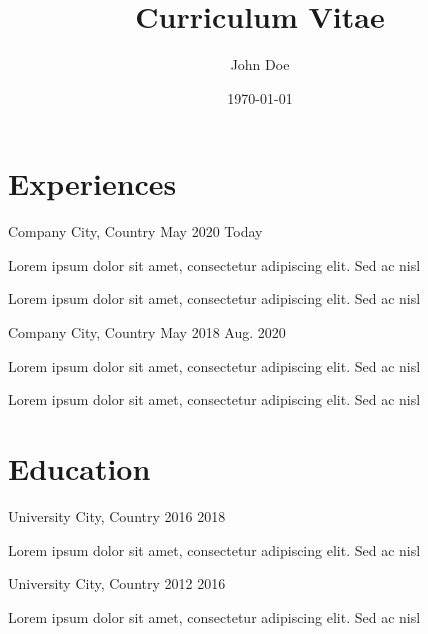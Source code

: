 \documentclass[english]{currivitae-elegant}
\title{Curriculum Vitae}
\author{John Doe}
\date{\today}
\begin{document}

\section[\faBriefcase]{Experiences}
           {Company}
           {City, Country}
           {May 2020}
           {Today}
           {
            \begin{compactitem}[]
                \item Lorem ipsum dolor sit amet, consectetur adipiscing elit. Sed ac nisl
                \item Lorem ipsum dolor sit amet, consectetur adipiscing elit. Sed ac nisl
            \end{compactitem}
           }

           {Company}
           {City, Country}
           {May 2018}
           {Aug. 2020}
           {
            \begin{compactitem}[]
                \item Lorem ipsum dolor sit amet, consectetur adipiscing elit. Sed ac nisl
                \item Lorem ipsum dolor sit amet, consectetur adipiscing elit. Sed ac nisl
            \end{compactitem}
           }

\section[\faGraduationCap]{Education}
           {University}
           {City, Country}
           {2016}
           {2018}
           {
            \begin{compactitem}[]
                \item Lorem ipsum dolor sit amet, consectetur adipiscing elit. Sed ac nisl
            \end{compactitem}
           }

           {University}
           {City, Country}
           {2012}
           {2016}
           {
            \begin{compactitem}[]
                \item Lorem ipsum dolor sit amet, consectetur adipiscing elit. Sed ac nisl
            \end{compactitem}
           }
\end{document}
